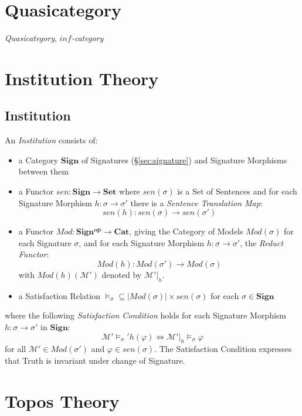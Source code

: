 \section{Quasicategory}\label{sec:quasicategory}

\emph{Quasicategory}, \emph{$inf$-category}



\section{Institution Theory}\label{sec:institution_theory}

\subsection{Institution}\label{sec:institution}

An \emph{Institution} consists of:

\begin{itemize}
\item a Category $\mathbf{Sign}$ of Signatures (\S\ref{sec:signature})
  and Signature Morphisms between them
\item a Functor $sen : \mathbf{Sign} \rightarrow \mathbf{Set}$ where
  $sen(\sigma)$ is a Set of Sentences and for each Signature Morphism
  $h : \sigma \rightarrow \sigma'$ there is a \emph{Sentence
  Translation Map}:
  \[
    sen(h) : sen(\sigma) \rightarrow sen(\sigma')
  \]
\item a Functor $Mod : \mathbf{Sign^{op}} \rightarrow \mathbf{Cat}$,
  giving the Category of Models $Mod (\sigma)$ for each Signature
  $\sigma$, and for each Signature Morphism $h : \sigma \rightarrow
  \sigma'$, the \emph{Reduct Functor}:
  \[
    Mod(h) : Mod(\sigma') \rightarrow Mod(\sigma)
  \]
  with $Mod(h)(\mathcal{M}')$ denoted by $\mathcal{M}'|_h$.
\item a Satisfaction Relation $\models_\sigma \subseteq |Mod(\sigma)|
  \times sen(\sigma)$ for each $\sigma \in \mathbf{Sign}$
\end{itemize}
where the following \emph{Satisfaction Condition} holds for each
Signature Morphism $h : \sigma \rightarrow \sigma'$ in
$\mathbf{Sign}$:
\[
  \mathcal{M}' \models_\sigma' h(\varphi) \Leftrightarrow
  \mathcal{M}'|_h \models_\sigma \varphi
\]
for all $\mathcal{M}' \in Mod(\sigma')$ and $\varphi \in sen(\sigma)$.
The Satisfaction Condition expresses that Truth is invariant under
change of Signature.



\section{Topos Theory}\label{sec:topos_theory}
